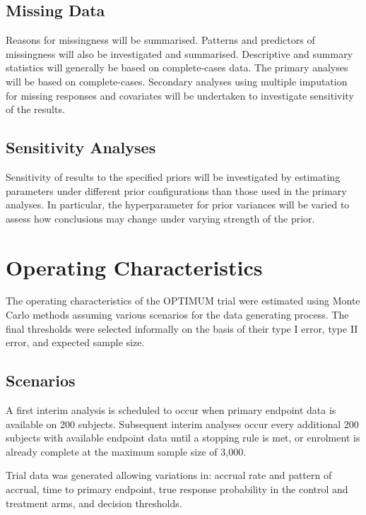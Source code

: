 \documentclass{bmcart}
\begin{document}
\subsection*{Missing Data}

Reasons for missingness will be summarised.
Patterns and predictors of missingness will also be investigated and summarised.
Descriptive and summary statistics will generally be based on complete-cases data.
The primary analyses will be based on complete-cases.
Secondary analyses using multiple imputation for missing responses and covariates will be undertaken to investigate sensitivity of the results.

\subsection*{Sensitivity Analyses}

Sensitivity of results to the specified priors will be investigated by estimating parameters under different prior configurations than those used in the primary analyses.
In particular, the hyperparameter for prior variances will be varied to assess how conclusions may change under varying strength of the prior.

\section*{Operating Characteristics}

The operating characteristics of the OPTIMUM trial were estimated using Monte Carlo methods assuming 
various scenarios for the data generating process. 
The final thresholds were selected informally on the basis of their type I error, type II error, and expected sample size.

\subsection*{Scenarios}

A first interim analysis is scheduled to occur when primary endpoint data is available on 200 subjects.
Subsequent interim analyses occur every additional 200 subjects with available endpoint data until a stopping rule is met, or enrolment is already complete at the maximum sample size of 3,000.

Trial data was generated allowing variations in: accrual rate and pattern of accrual, time to primary endpoint, true response probability in the control and treatment arms, and decision thresholds.
\end{document}
